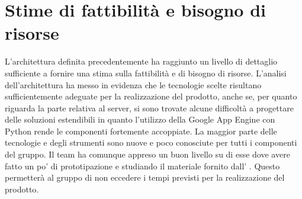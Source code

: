 %
%


\section{Stime di fattibilità e bisogno di risorse} %
\label{sec:stime_di_fattibilita}
L’architettura definita precedentemente ha raggiunto un livello di dettaglio sufficiente a fornire una stima sulla fattibilità e di bisogno di risorse. L’analisi dell’architettura ha messo in evidenza che le tecnologie scelte risultano sufficientemente adeguate per la realizzazione del prodotto, anche se, per quanto riguarda la parte relativa al server, si sono trovate alcune difficoltà a progettare delle soluzioni estendibili in quanto l'utilizzo della Google App Engine con Python rende le componenti fortemente accoppiate. \newline
La maggior parte delle tecnologie e degli strumenti sono nuove e poco conosciute per tutti i componenti del gruppo. Il team ha comunque appreso un buon livello su di esse dove avere fatto un po' di prototipazione e studiando il materiale fornito dall' \roleAdministrator. Questo permetterà al gruppo di non eccedere i tempi previsti per la realizzazione del prodotto.

